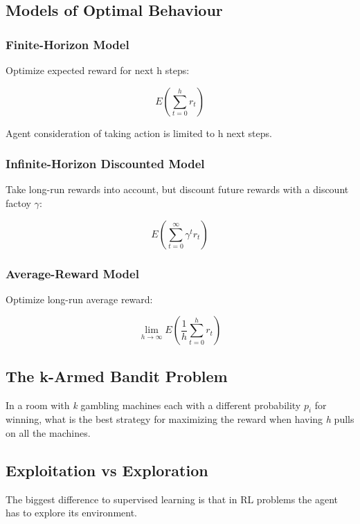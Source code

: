 \documentclass[	DIV=calc,%
				paper=a4,%
				fontsize=11pt,%
				twocolumn]{scrartcl}	 %
\begin{document}
\subsection{Models of Optimal Behaviour}
\subsubsection{Finite-Horizon Model}
Optimize expected reward for next h steps:

\begin{equation}\label{eq:finite}
	E (\sum^h_{t=0}r_t)
\end{equation}

Agent consideration of taking action is limited to h next steps.

\subsubsection{Infinite-Horizon Discounted Model}
Take long-run rewards into account, but discount future rewards with a discount factoy $\gamma$:

\begin{equation}\label{eq:discount}	E(\sum^{\infty}_{t=0}\gamma^tr_t)
\end{equation}

\subsubsection{Average-Reward Model}
Optimize long-run average reward:

\begin{equation}\label{eq:average}
\lim_{h\rightarrow \infty}E(\frac{1}{h}\sum^h_{t=0}r_t) 
\end{equation}

\subsection{The k-Armed Bandit Problem}
In a room with \textit{k} gambling machines each with a different probability \textit{$p_i$} for winning, what is the best strategy for maximizing the reward when having \textit{h} pulls on all the machines.

\subsection{Exploitation vs Exploration}
The biggest difference to supervised learning is that in RL problems the agent has to explore its environment.
\end{document}
